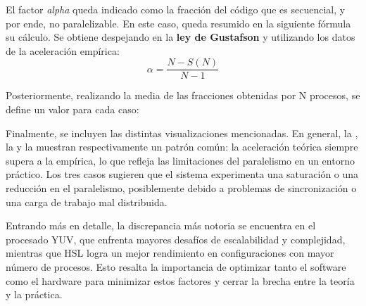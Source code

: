 El factor \textit{alpha} queda indicado como la fracción del código que es secuencial, y por ende, no paralelizable. En este caso, queda resumido en la siguiente fórmula su cálculo. Se obtiene despejando en la \textbf{ley de Gustafson} y utilizando los datos de la aceleración empírica:
\[
\alpha = \frac{N - S(N)}{N - 1}
\]

Posteriormente, realizando la media de las fracciones obtenidas por N procesos, se define un valor para cada caso:


Finalmente, se incluyen las distintas visualizaciones mencionadas. En general, la , la  y la  muestran respectivamente un patrón común: la aceleración teórica siempre supera a la empírica, lo que refleja las limitaciones del paralelismo en un entorno práctico. Los tres casos sugieren que el sistema experimenta una saturación o una reducción en el paralelismo, posiblemente debido a problemas de sincronización o una carga de trabajo mal distribuida. 

Entrando más en detalle, la discrepancia más notoria se encuentra en el procesado YUV, que enfrenta mayores desafíos de escalabilidad y complejidad, mientras que HSL logra un mejor rendimiento en configuraciones con mayor número de procesos. Esto resalta la importancia de optimizar tanto el software como el hardware para minimizar estos factores y cerrar la brecha entre la teoría y la práctica.

